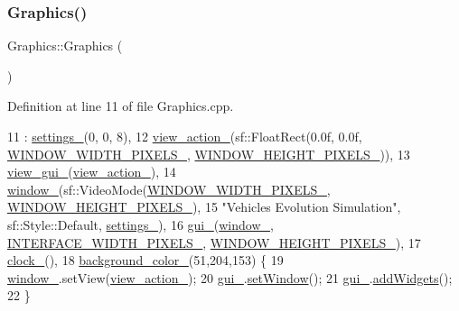 \mbox{\label{classGraphics_af2e8fe67fd31ec263c843a6e28b29d3c}} 
\subsubsection{\texorpdfstring{Graphics()}{Graphics()}\hspace{0.1cm}{\footnotesize\ttfamily [2/2]}}
{\footnotesize\ttfamily Graphics\+::\+Graphics (\begin{DoxyParamCaption}{ }\end{DoxyParamCaption})\hspace{0.3cm}{\ttfamily [private]}}



Definition at line 11 of file Graphics.\+cpp.


\begin{DoxyCode}
11                    : \hyperlink{classGraphics_ab8d68b2977c39547e1c10a7669698aca}{settings\_}(0, 0, 8),
12                        \hyperlink{classGraphics_a60792a296f5e93dbd1d086398e20cbd0}{view\_action\_}(sf::FloatRect(0.0f, 0.0f, 
      \hyperlink{classGraphics_a4e8cd4a9f4799e3b7f5e85685d6d4905}{WINDOW\_WIDTH\_PIXELS\_}, \hyperlink{classGraphics_a2838b79511d56711b88e677ad48c54e9}{WINDOW\_HEIGHT\_PIXELS\_})),
13                        \hyperlink{classGraphics_aaca5b237fae17f3166f8f28e4c363e06}{view\_gui\_}(\hyperlink{classGraphics_a60792a296f5e93dbd1d086398e20cbd0}{view\_action\_}),
14                        \hyperlink{classGraphics_ac760fe1abb0b648844c9f15afa087ef6}{window\_}(sf::VideoMode(\hyperlink{classGraphics_a4e8cd4a9f4799e3b7f5e85685d6d4905}{WINDOW\_WIDTH\_PIXELS\_}, 
      \hyperlink{classGraphics_a2838b79511d56711b88e677ad48c54e9}{WINDOW\_HEIGHT\_PIXELS\_}),
15                                \textcolor{stringliteral}{"Vehicles Evolution Simulation"}, sf::Style::Default, 
      \hyperlink{classGraphics_ab8d68b2977c39547e1c10a7669698aca}{settings\_}),
16                        \hyperlink{classGraphics_ac582857f6b0de010eabd0146c4a5f4d2}{gui\_}(\hyperlink{classGraphics_ac760fe1abb0b648844c9f15afa087ef6}{window\_}, \hyperlink{classGraphics_aac15ea113ea8c69d5e54996513886110}{INTERFACE\_WIDTH\_PIXELS\_}, 
      \hyperlink{classGraphics_a2838b79511d56711b88e677ad48c54e9}{WINDOW\_HEIGHT\_PIXELS\_}),
17                        \hyperlink{classGraphics_ad9850d50fe5792666c8aea88f39ba99c}{clock\_}(),
18                        \hyperlink{classGraphics_a44d7a76a58e03b8ad3f025123894c526}{background\_color\_}(51,204,153) \{
19     \hyperlink{classGraphics_ac760fe1abb0b648844c9f15afa087ef6}{window\_}.setView(\hyperlink{classGraphics_a60792a296f5e93dbd1d086398e20cbd0}{view\_action\_});
20     \hyperlink{classGraphics_ac582857f6b0de010eabd0146c4a5f4d2}{gui\_}.\hyperlink{classGraphicalUserInterface_a9dc5f335b77be5a4d871926155afb8dd}{setWindow}();
21     \hyperlink{classGraphics_ac582857f6b0de010eabd0146c4a5f4d2}{gui\_}.\hyperlink{classGraphicalUserInterface_a48e6dcc9acc179fdb74e67a51d66efb7}{addWidgets}();
22 \}
\end{DoxyCode}


